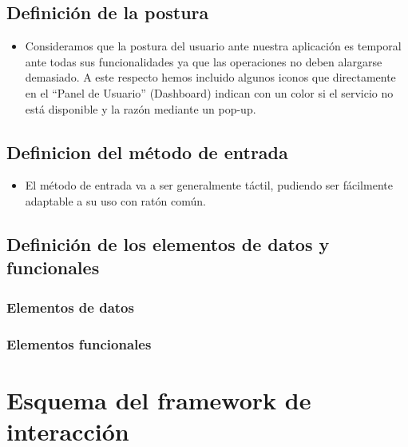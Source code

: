 \documentclass[12pt]{article}
\begin{document}
\subsection{Definición de la postura}
\begin{itemize}

\item Consideramos que la postura del usuario ante nuestra aplicación es temporal ante todas sus funcionalidades ya que las operaciones no deben alargarse demasiado. A este respecto hemos incluido algunos iconos que directamente en el “Panel de Usuario” (Dashboard) indican con un color si el servicio no está disponible y la razón mediante un pop-up.

\end{itemize}
\subsection{Definicion del método de entrada}
\begin{itemize}

\item El método de entrada va a ser generalmente táctil, pudiendo ser fácilmente adaptable a su uso con ratón común.

\end{itemize}
\subsection{Definición de los elementos de datos y funcionales }
    \subsubsection{Elementos de datos}
    \subsubsection{Elementos funcionales}
\newpage
\section{Esquema del framework de interacción}
\end{document}
